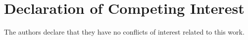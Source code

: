 \section*{Declaration of Competing Interest}
The authors declare that they have no conflicts of interest related to this work.

